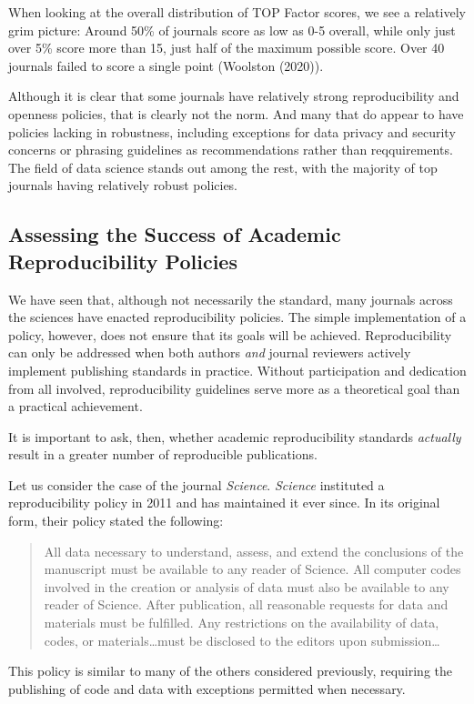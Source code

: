 \documentclass[12pt,twoside]{reedthesis}
\begin{document}
When looking at the overall distribution of TOP Factor scores, we see a
relatively grim picture: Around 50\% of journals score as low as 0-5
overall, while only just over 5\% score more than 15, just half of the
maximum possible score. Over 40 journals failed to score a single point
(Woolston (2020)).

Although it is clear that some journals have relatively strong
reproducibility and openness policies, that is clearly not the norm. And
many that do appear to have policies lacking in robustness, including
exceptions for data privacy and security concerns or phrasing guidelines
as recommendations rather than reqquirements. The field of data science
stands out among the rest, with the majority of top journals having
relatively robust policies.

\subsection{Assessing the Success of Academic Reproducibility
Policies}\label{assessing-the-success-of-academic-reproducibility-policies}

We have seen that, although not necessarily the standard, many journals
across the sciences have enacted reproducibility policies. The simple
implementation of a policy, however, does not ensure that its goals will
be achieved. Reproducibility can only be addressed when both authors
\emph{and} journal reviewers actively implement publishing standards in
practice. Without participation and dedication from all involved,
reproducibility guidelines serve more as a theoretical goal than a
practical achievement.

It is important to ask, then, whether academic reproducibility standards
\emph{actually} result in a greater number of reproducible publications.

Let us consider the case of the journal \emph{Science}. \emph{Science}
instituted a reproducibility policy in 2011 and has maintained it ever
since. In its original form, their policy stated the following:
\begin{quote}
All data necessary to understand, assess, and extend the conclusions of
the manuscript must be available to any reader of Science. All computer
codes involved in the creation or analysis of data must also be
available to any reader of Science. After publication, all reasonable
requests for data and materials must be fulfilled. Any restrictions on
the availability of data, codes, or materials\ldots{}must be disclosed
to the editors upon submission\ldots{}
\end{quote}
This policy is similar to many of the others considered previously,
requiring the publishing of code and data with exceptions permitted when
necessary.
\end{document}
